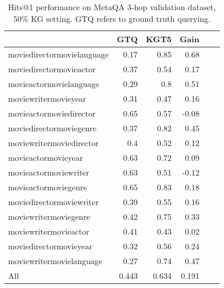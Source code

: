\documentclass[11pt]{article}
\renewcommand\:{\colon} \newcommand{\sset}[1]{\left\{\,#1\,\right\}} \newcommand{\ssets}[1]{\left\{#1\right\}} \newcommand{\ssetn}[1]{\{\,#1\,\}}
\begin{document}
\begin{table*}[ht!]
\begin{tabular}{@{}lrrrrr@{}}
\begin{table*}[ht!]
\centering
\begin{tabular}{@{}lrrr@{}}
\toprule
\textbf{Question type} & \multicolumn{1}{l}{\textbf{GTQ}} & \multicolumn{1}{l}{\textbf{KGT5}} & \multicolumn{1}{l}{\textbf{Gain}} \\ \midrule
moviedirectormovielanguage & 0.17 & 0.85 & \cellcolor[HTML]{57BB8A}0.68  \\
moviedirectormovieactor    & 0.37 & 0.54 & \cellcolor[HTML]{D5EEE2}0.17  \\
movieactormovielanguage    & 0.29 & 0.8  & \cellcolor[HTML]{81CCA8}0.51  \\
moviewritermovieyear       & 0.31 & 0.47 & \cellcolor[HTML]{D8EFE4}0.16  \\
movieactormoviedirector    & 0.65 & 0.57 & \cellcolor[HTML]{F7D7D5}-0.08 \\
moviedirectormoviegenre    & 0.37 & 0.82 & \cellcolor[HTML]{90D3B2}0.45  \\
moviewritermoviedirector   & 0.4  & 0.52 & \cellcolor[HTML]{E2F3EB}0.12  \\
movieactormovieyear        & 0.63 & 0.72 & \cellcolor[HTML]{E9F7F0}0.09  \\
movieactormoviewriter      & 0.63 & 0.51 & \cellcolor[HTML]{F7D7D5}-0.12 \\
movieactormoviegenre       & 0.65 & 0.83 & \cellcolor[HTML]{D3EEE1}0.18  \\
moviedirectormoviewriter   & 0.39 & 0.55 & \cellcolor[HTML]{D8EFE4}0.16  \\
moviewritermoviegenre      & 0.42 & 0.75 & \cellcolor[HTML]{AEDEC7}0.33  \\
moviewritermovieactor      & 0.41 & 0.43 & \cellcolor[HTML]{FBFDFC}0.02  \\
moviedirectormovieyear     & 0.32 & 0.56 & \cellcolor[HTML]{C4E7D6}0.24  \\
moviewritermovielanguage   & 0.27 & 0.74 & \cellcolor[HTML]{8BD0AF}0.47  \\ \midrule
All                                          & 0.443 & 0.634 & 0.191                          \\ \bottomrule
\end{tabular}\caption{Hits@1 performance on MetaQA 3-hop validation dataset, 50\% KG setting. GTQ refers to ground truth querying.}
\label{tab:metaqa_analysis_3hop}
\end{table*} 
\end{document}
